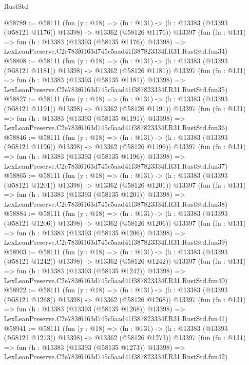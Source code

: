 \begin{lexlean}{RustStd}
\begin{coremodule}
@58789 := @58111
    (fun (y : @18) =>
    (fn : @131) -> (h : @13383 (@13393 (@58121 @1176)) @13398) -> @13362 (@58126 @1176))
    @13397
    (fun (fn : @131) =>
    fun (h : @13383 (@13393 (@58135 @1176)) @13398) =>
    LexLeanPreserve.C2e783f6163d745c5aad41f387823334f.R31.RustStd.fun34)
@58808 := @58111
    (fun (y : @18) =>
    (fn : @131) -> (h : @13383 (@13393 (@58121 @1181)) @13398) -> @13362 (@58126 @1181))
    @13397
    (fun (fn : @131) =>
    fun (h : @13383 (@13393 (@58135 @1181)) @13398) =>
    LexLeanPreserve.C2e783f6163d745c5aad41f387823334f.R31.RustStd.fun35)
@58827 := @58111
    (fun (y : @18) =>
    (fn : @131) -> (h : @13383 (@13393 (@58121 @1191)) @13398) -> @13362 (@58126 @1191))
    @13397
    (fun (fn : @131) =>
    fun (h : @13383 (@13393 (@58135 @1191)) @13398) =>
    LexLeanPreserve.C2e783f6163d745c5aad41f387823334f.R31.RustStd.fun36)
@58846 := @58111
    (fun (y : @18) =>
    (fn : @131) -> (h : @13383 (@13393 (@58121 @1196)) @13398) -> @13362 (@58126 @1196))
    @13397
    (fun (fn : @131) =>
    fun (h : @13383 (@13393 (@58135 @1196)) @13398) =>
    LexLeanPreserve.C2e783f6163d745c5aad41f387823334f.R31.RustStd.fun37)
@58865 := @58111
    (fun (y : @18) =>
    (fn : @131) -> (h : @13383 (@13393 (@58121 @1201)) @13398) -> @13362 (@58126 @1201))
    @13397
    (fun (fn : @131) =>
    fun (h : @13383 (@13393 (@58135 @1201)) @13398) =>
    LexLeanPreserve.C2e783f6163d745c5aad41f387823334f.R31.RustStd.fun38)
@58884 := @58111
    (fun (y : @18) =>
    (fn : @131) -> (h : @13383 (@13393 (@58121 @1206)) @13398) -> @13362 (@58126 @1206))
    @13397
    (fun (fn : @131) =>
    fun (h : @13383 (@13393 (@58135 @1206)) @13398) =>
    LexLeanPreserve.C2e783f6163d745c5aad41f387823334f.R31.RustStd.fun39)
@58903 := @58111
    (fun (y : @18) =>
    (fn : @131) -> (h : @13383 (@13393 (@58121 @1242)) @13398) -> @13362 (@58126 @1242))
    @13397
    (fun (fn : @131) =>
    fun (h : @13383 (@13393 (@58135 @1242)) @13398) =>
    LexLeanPreserve.C2e783f6163d745c5aad41f387823334f.R31.RustStd.fun40)
@58922 := @58111
    (fun (y : @18) =>
    (fn : @131) -> (h : @13383 (@13393 (@58121 @1268)) @13398) -> @13362 (@58126 @1268))
    @13397
    (fun (fn : @131) =>
    fun (h : @13383 (@13393 (@58135 @1268)) @13398) =>
    LexLeanPreserve.C2e783f6163d745c5aad41f387823334f.R31.RustStd.fun41)
@58941 := @58111
    (fun (y : @18) =>
    (fn : @131) -> (h : @13383 (@13393 (@58121 @1273)) @13398) -> @13362 (@58126 @1273))
    @13397
    (fun (fn : @131) =>
    fun (h : @13383 (@13393 (@58135 @1273)) @13398) =>
    LexLeanPreserve.C2e783f6163d745c5aad41f387823334f.R31.RustStd.fun42)

\end{coremodule}
\end{lexlean}
